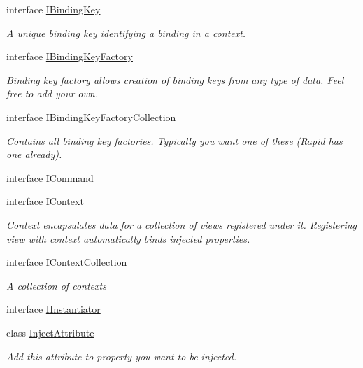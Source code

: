 \begin{DoxyCompactItemize}
interface \mbox{\hyperlink{interfacecp_games_1_1core_1_1_rapid_m_v_c_1_1_i_binding_key}{I\+Binding\+Key}}
\begin{DoxyCompactList}\small\item\em A unique binding key identifying a binding in a context. \end{DoxyCompactList}\item 
interface \mbox{\hyperlink{interfacecp_games_1_1core_1_1_rapid_m_v_c_1_1_i_binding_key_factory}{I\+Binding\+Key\+Factory}}
\begin{DoxyCompactList}\small\item\em Binding key factory allows creation of binding keys from any type of data. Feel free to add your own. \end{DoxyCompactList}\item 
interface \mbox{\hyperlink{interfacecp_games_1_1core_1_1_rapid_m_v_c_1_1_i_binding_key_factory_collection}{I\+Binding\+Key\+Factory\+Collection}}
\begin{DoxyCompactList}\small\item\em Contains all binding key factories. Typically you want one of these (Rapid has one already). \end{DoxyCompactList}\item 
interface \mbox{\hyperlink{interfacecp_games_1_1core_1_1_rapid_m_v_c_1_1_i_command}{I\+Command}}
\item 
interface \mbox{\hyperlink{interfacecp_games_1_1core_1_1_rapid_m_v_c_1_1_i_context}{I\+Context}}
\begin{DoxyCompactList}\small\item\em Context encapsulates data for a collection of views registered under it. Registering view with context automatically binds injected properties. \end{DoxyCompactList}\item 
interface \mbox{\hyperlink{interfacecp_games_1_1core_1_1_rapid_m_v_c_1_1_i_context_collection}{I\+Context\+Collection}}
\begin{DoxyCompactList}\small\item\em A collection of contexts \end{DoxyCompactList}\item 
interface \mbox{\hyperlink{interfacecp_games_1_1core_1_1_rapid_m_v_c_1_1_i_instantiator}{I\+Instantiator}}
\item 
class \mbox{\hyperlink{classcp_games_1_1core_1_1_rapid_m_v_c_1_1_inject_attribute}{Inject\+Attribute}}
\begin{DoxyCompactList}\small\item\em Add this attribute to property you want to be injected. \end{DoxyCompactList}\item 

\end{DoxyCompactItemize}
